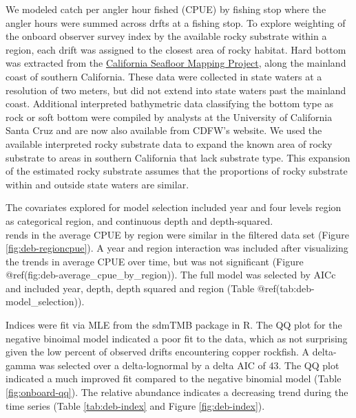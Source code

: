 \documentclass[11pt,
  english,
  letterpaper,
]{article}
\begin{document}
We modeled catch per angler hour fished (CPUE) by fishing stop where the angler hours were summed across drfts at a fishing stop. To explore weighting of the onboard observer survey index by the available rocky substrate within a region, each drift was assigned to the closest area of rocky habitat. Hard bottom was extracted from the \href{http://seafloor.otterlabs.org/index.html}{California Seafloor Mapping Project}, along the mainland coast of southern California. These data were collected in state waters at a resolution of two meters, but did not extend into state waters past the mainland coast. Additional interpreted bathymetric data classifying the bottom type as rock or soft bottom were compiled by analysts at the University of California Santa Cruz and are now also available from CDFW's website. We used the available interpreted rocky substrate data to expand the known area of rocky substrate to areas in southern California that lack substrate type. This expansion of the estimated rocky substrate assumes that the proportions of rocky substrate within and outside state waters are similar.

The covariates explored for model selection included year and four levels region as categorical region, and continuous depth and depth-squared.\\
rends in the average CPUE by region were similar in the filtered data set (Figure \ref{fig:deb-regioncpue}). A year and region interaction was included after visualizing the trends in average CPUE over time, but was not significant (Figure @ref(fig:deb-average\_cpue\_by\_region)). The full model was selected by AICc and included year, depth, depth squared and region (Table @ref(tab:deb-model\_selection)).

Indices were fit via MLE from the sdmTMB package in R. The QQ plot for the negative binoimal model indicated a poor fit to the data, which as not surprising given the low percent of observed drifts encountering copper rockfish. A delta-gamma was selected over a delta-lognormal by a delta AIC of 43. The QQ plot indicated a much improved fit compared to the negative binomial model (Table \ref{fig:onboard-qq}). The relative abundance indicates a decreasing trend during the time series (Table \ref{tab:deb-index} and Figure \ref{fig:deb-index}).

\newpage

\newpage

\begingroup\fontsize{10}{12}\selectfont
\begingroup\fontsize{10}{12}\selectfont
\end{document}
